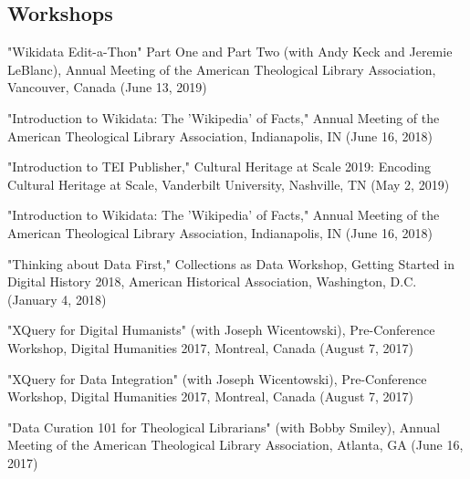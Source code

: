\documentclass[10pt]{res} %
\begin{document}
\begin{resume}
\section{Workshops}

\begin{hangparas}{.25in}{1}"Wikidata Edit-a-Thon" Part One and Part Two (with Andy Keck and Jeremie LeBlanc), Annual Meeting of the American Theological Library Association, Vancouver, Canada (June 13, 2019)\end{hangparas}

\begin{hangparas}{.25in}{1}"Introduction to Wikidata: The 'Wikipedia' of Facts," Annual Meeting of the American Theological Library Association, Indianapolis, IN (June 16, 2018)\end{hangparas}

\begin{hangparas}{.25in}{1}"Introduction to TEI Publisher," Cultural Heritage at Scale 2019: Encoding Cultural Heritage at Scale, Vanderbilt University, Nashville, TN (May 2, 2019)\end{hangparas}

\begin{hangparas}{.25in}{1}"Introduction to Wikidata: The 'Wikipedia' of Facts," Annual Meeting of the American Theological Library Association, Indianapolis, IN (June 16, 2018)\end{hangparas}

\begin{hangparas}{.25in}{1}"Thinking about Data First," Collections as Data Workshop, Getting Started in Digital History 2018, American Historical Association, Washington, D.C. (January 4, 2018)\end{hangparas}

\begin{hangparas}{.25in}{1}"XQuery for Digital Humanists" (with Joseph Wicentowski), Pre-Conference Workshop, Digital Humanities 2017, Montreal, Canada (August 7, 2017)\end{hangparas}

\begin{hangparas}{.25in}{1}"XQuery for Data Integration" (with Joseph Wicentowski), Pre-Conference Workshop, Digital Humanities 2017, Montreal, Canada (August 7, 2017)\end{hangparas}

\begin{hangparas}{.25in}{1}"Data Curation 101 for Theological Librarians" (with Bobby Smiley), Annual Meeting of the American Theological Library Association, Atlanta, GA (June 16, 2017)\end{hangparas}


\end{resume}
\end{document}
